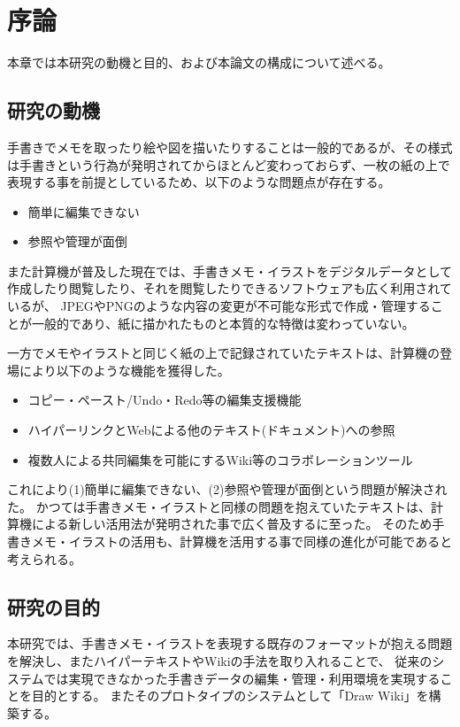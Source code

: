 \chapter{序論}
\label{chap:introduction}

本章では本研究の動機と目的、および本論文の構成について述べる。

\newpage

\section{研究の動機}

手書きでメモを取ったり絵や図を描いたりすることは一般的であるが、その様式は手書きという行為が発明されてからほとんど変わっておらず、一枚の紙の上で表現する事を前提としているため、以下のような問題点が存在する。

\begin{itemize}
    \item 簡単に編集できない
    \item 参照や管理が面倒
\end{itemize}

また計算機が普及した現在では、手書きメモ・イラストをデジタルデータとして作成したり閲覧したり、それを閲覧したりできるソフトウェアも広く利用されているが、
JPEGやPNGのような内容の変更が不可能な形式で作成・管理することが一般的であり、紙に描かれたものと本質的な特徴は変わっていない。

一方でメモやイラストと同じく紙の上で記録されていたテキストは、計算機の登場により以下のような機能を獲得した。

\begin{itemize}
    \item コピー・ペースト/Undo・Redo等の編集支援機能
    \item ハイパーリンクとWebによる他のテキスト(ドキュメント)への参照
    \item 複数人による共同編集を可能にするWiki等のコラボレーションツール
\end{itemize}

これにより(1)簡単に編集できない、(2)参照や管理が面倒という問題が解決された。
かつては手書きメモ・イラストと同様の問題を抱えていたテキストは、計算機による新しい活用法が発明された事で広く普及するに至った。
そのため手書きメモ・イラストの活用も、計算機を活用する事で同様の進化が可能であると考えられる。

\section{研究の目的}
本研究では、手書きメモ・イラストを表現する既存のフォーマットが抱える問題を解決し、またハイパーテキストやWikiの手法を取り入れることで、
従来のシステムでは実現できなかった手書きデータの編集・管理・利用環境を実現することを目的とする。
またそのプロトタイプのシステムとして「Draw Wiki」を構築する。

